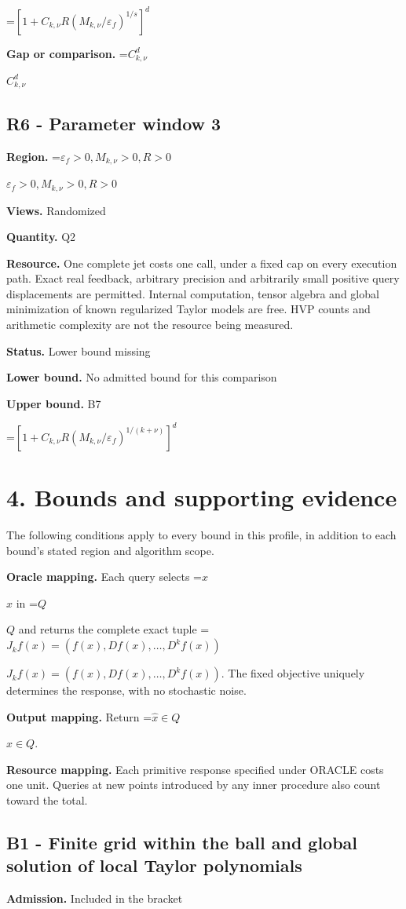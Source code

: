 \documentclass[10pt,a4paper]{article}
\newcommand{\AtlasMath}[1]{\par\begingroup\centering\setbox0=\hbox{$\displaystyle #1$}\ifdim\wd0>1.4\linewidth\typeout{ATLAS WIDE FORMULA: \the\wd0}\fi\ifdim\wd0>\linewidth\resizebox{\linewidth}{!}{\box0}\else\box0\fi\par\endgroup}
\newcommand{\AtlasInlineMath}[1]{\begingroup\setbox0=\hbox{$#1$}\ifdim\wd0>.4\linewidth\endgroup\AtlasMath{#1}\else\endgroup$#1$\fi}
\begin{document}
\AtlasMath{[1+C_{k,\nu}R(M_{k,\nu}/\varepsilon_f)^{1/s}]^d}
\textbf{Gap or comparison.} \AtlasInlineMath{C_{k,\nu}^{d}}

\subsection{R6 - Parameter window 3}
\textbf{Region.} \AtlasInlineMath{\varepsilon_f>0,M_{k,\nu}>0,R>0}

\textbf{Views.} Randomized

\textbf{Quantity.} Q2

\textbf{Resource.} One complete jet costs one call, under a fixed cap on every execution path. Exact real feedback, arbitrary precision and arbitrarily small positive query displacements are permitted. Internal computation, tensor algebra and global minimization of known regularized Taylor models are free. HVP counts and arithmetic complexity are not the resource being measured.

\textbf{Status.} Lower bound missing

\textbf{Lower bound.} No admitted bound for this comparison

\textbf{Upper bound.} B7

\AtlasMath{[1+C_{k,\nu}R(M_{k,\nu}/\varepsilon_f)^{1/(k+\nu)}]^d}
\section{4. Bounds and supporting evidence}
The following conditions apply to every bound in this profile, in addition to each bound's stated region and algorithm scope.

\textbf{Oracle mapping.} Each query selects \AtlasInlineMath{x} in \AtlasInlineMath{Q} and returns the complete exact tuple \AtlasInlineMath{J_{k}f(x)=(f(x),Df(x),\ldots,D^{k}f(x))}. The fixed objective uniquely determines the response, with no stochastic noise.

\textbf{Output mapping.} Return \AtlasInlineMath{\widehat{x}\in Q}.

\textbf{Resource mapping.} Each primitive response specified under ORACLE costs one unit. Queries at new points introduced by any inner procedure also count toward the total.

\subsection{B1 - Finite grid within the ball and global solution of local Taylor polynomials}
\textbf{Admission.} Included in the bracket
\end{document}
